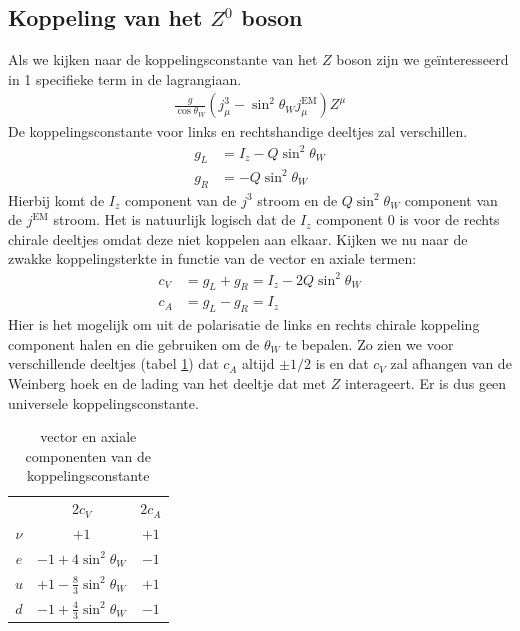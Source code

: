 \documentclass[../main.tex]{subfiles}
\begin{document}
\subsection{Koppeling van het $Z^0$ boson}%
\label{sub:koppeling_van_het_z_0_boson}

Als we kijken naar de koppelingsconstante van het $Z$ boson zijn we geïnteresseerd in 1 specifieke term in de lagrangiaan.
\begin{equation}
    \begin{aligned}
        \label{eq:z_term_lagrangiaan}
        \frac{g}{\cos\theta_W} (j_\mu^3 - \sin^2\theta_Wj_\mu^\text{EM})Z^\mu
    \end{aligned}
\end{equation}
De koppelingsconstante voor links en rechtshandige deeltjes zal verschillen.
\begin{equation}
    \begin{aligned}
        \label{eq:z_koppelingsterkte}
        g_L &= I_z - Q\sin^2\theta_W\\
        g_R &= -Q\sin^2\theta_W
    \end{aligned}
\end{equation}
Hierbij komt de $I_z$ component van de $j^3$ stroom en de $Q\sin^2\theta_W$ component van de $j^\text{EM}$ stroom. Het is natuurlijk logisch dat de $I_z$ component 0 is voor de rechts chirale deeltjes omdat deze niet koppelen aan elkaar. Kijken we nu naar de zwakke koppelingsterkte in functie van de vector en axiale termen:
\begin{equation}
    \begin{aligned}
        \label{eq:zwakke_koppelingsconstante}
        c_V &= g_L + g_R = I_z - 2Q\sin^2\theta_W\\
        c_A &= g_L - g_R = I_z
    \end{aligned}
\end{equation}
Hier is het mogelijk om uit de polarisatie de links en rechts chirale koppeling component halen en die gebruiken om de $\theta_W$ te bepalen. Zo zien we voor verschillende deeltjes (tabel \ref{tab:v_a_comp_kc}) dat $c_A$ altijd $\pm1/2$ is en dat $c_V$ zal afhangen van de Weinberg hoek en de lading van het deeltje dat met $Z$ interageert. Er is dus geen universele koppelingsconstante.

\begin{table}[h]
    \centering
    \caption{vector en axiale componenten van de koppelingsconstante}
    \label{tab:v_a_comp_kc}
    \begin{tabular}{ccc}
                & $2c_V$                            & $2c_A$    \\
        $\nu$   & $+1$                              & $+1$      \\
        $e$     & $-1+4\sin^2\theta_W$              & $-1$      \\
        $u$     & $+1-\frac{8}{3}\sin^2\theta_W$    & $+1$      \\
        $d$     & $-1+\frac{4}{3}\sin^2\theta_W$    & $-1$      \\
    \end{tabular}
\end{table}
\end{document}
